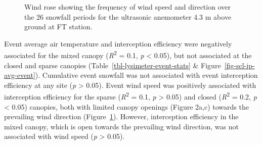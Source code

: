 \documentclass[
  letterpaper,
  DIV=11,
  numbers=noendperiod]{scrartcl}
\begin{document}

\begin{figure}[H]


\caption{\label{fig-wind-rose}Wind rose showing the frequency of wind
speed and direction over the 26 snowfall periods for the ultrasonic
anemometer 4.3 m above ground at FT station.}

\end{figure}%

Event average air temperature and interception efficiency were
negatively associated for the mixed canopy (\emph{R}\textsuperscript{2}
= 0.1, \emph{p} \textless{} 0.05), but not associated at the closed and
sparse canopies (Table~\ref{tbl-lysimeter-event-stats} \&
Figure~\ref{fig-scl-ip-avg-event}). Cumulative event snowfall was not
associated with event interception efficiency at any site (\emph{p}
\textgreater{} 0.05). Event wind speed was positively associated with
interception efficiency for the sparse (\emph{R}\textsuperscript{2} =
0.1, \emph{p} \textgreater{} 0.05) and closed
(\emph{R}\textsuperscript{2} = 0.2, \emph{p} \textless{} 0.05) canopies,
both with limited canopy openings (Figure 2a,c) towards the prevailing
wind direction (Figure~\ref{fig-wind-rose}). However, interception
efficiency in the mixed canopy, which is open towards the prevailing
wind direction, was not associated with wind speed (\emph{p}
\textgreater{} 0.05).
\end{document}
